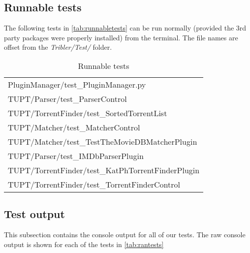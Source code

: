 \subsection{Runnable tests}
The following tests in \autoref{tab:runnabletests} can be run normally (provided the 3rd party 
packages were properly installed) from the terminal.
The file names are offset from the \textit{Tribler/Test/} folder.

\begin{table}[h]
\caption{Runnable tests}
\label{tab:runnabletests}
\begin{center}
\begin{tabular}{ l }
    PluginManager/test\_PluginManager.py\\
    TUPT/Parser/test\_ParserControl\\
    TUPT/TorrentFinder/test\_SortedTorrentList\\
    TUPT/Matcher/test\_MatcherControl\\
    TUPT/Matcher/test\_TestTheMovieDBMatcherPlugin\\
    TUPT/Parser/test\_IMDbParserPlugin\\
    TUPT/TorrentFinder/test\_KatPhTorrentFinderPlugin\\
    TUPT/TorrentFinder/test\_TorrentFinderControl\\
\end{tabular}
\end{center}
\end{table}

\subsection{Test output}
This subsection contains the console output for all of our tests.
The raw console output is shown for each of the tests in \autoref{tab:rantests}


